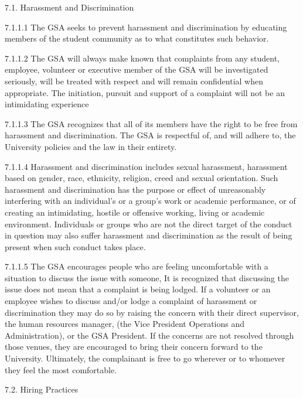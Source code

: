 ﻿7.1. Harassment and Discrimination 
 
 7.1.1.1 The GSA seeks to prevent harassment and discrimination by 
 educating members of the student community as to what constitutes 
 such behavior. 
 
 
 
 7.1.1.2 The GSA will always make known that complaints from any 
 student, employee, volunteer or executive member of the GSA will be 
 investigated seriously, will be treated with respect and will remain 
 confidential when appropriate. The initiation, pursuit and support of a 
 complaint will not be an intimidating experience 
 
 
 
 7.1.1.3 The GSA recognizes that all of its members have the right to be 
 free from harassment and discrimination. The GSA is respectful of, 
 and will adhere to, the University policies and the law in their entirety. 
 
 
 
 7.1.1.4 Harassment and discrimination includes sexual harassment, 
 harassment based on gender, race, ethnicity, religion, creed and 
 sexual orientation. Such harassment and discrimination has the 
 purpose or effect of unreasonably interfering with an individual's or a 
 group's work or academic performance, or of creating an intimidating, 
 hostile or offensive working, living or academic environment. 
 Individuals or groups who are not the direct target of the conduct in 
 question may also suffer harassment and discrimination as the result 
 of being present when such conduct takes place. 
 
 
 
 7.1.1.5 The GSA encourages people who are feeling uncomfortable with a 
 situation to discuss the issue with someone, It is recognized that 
 discussing the issue does not mean that a complaint is being lodged. If 
 a volunteer or an employee wishes to discuss and/or lodge a complaint 
 of harassment or discrimination they may do so by raising the concern 
 with their direct supervisor, the human resources manager, (the Vice 
 President Operations and Administration), or the GSA President. If the concerns are not resolved through those venues, they are encouraged 
 to bring their concern forward to the University. Ultimately, the 
 complainant is free to go wherever or to whomever they feel the most 
 comfortable. 
 
 
 
 7.2. Hiring Practices 
 
